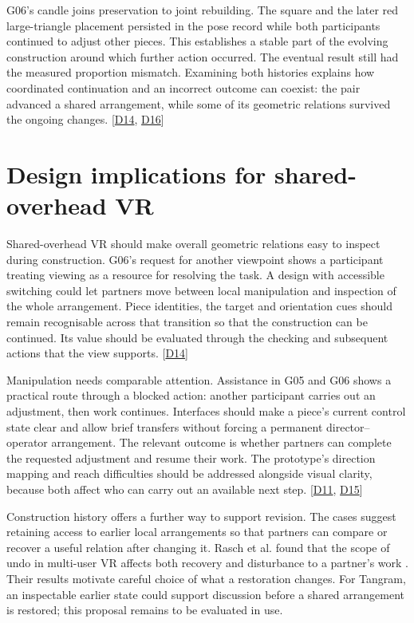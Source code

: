 G06's candle joins preservation to joint rebuilding. The square and the later red large-triangle placement persisted in the pose record while both participants continued to adjust other pieces. This establishes a stable part of the evolving construction around which further action occurred. The eventual result still had the measured proportion mismatch. Examining both histories explains how coordinated continuation and an incorrect outcome can coexist: the pair advanced a shared arrangement, while some of its geometric relations survived the ongoing changes. [\hyperlink{src:D14}{D14}, \hyperlink{src:D16}{D16}]

\section{Design implications for shared-overhead VR}\label{sec:6-4}

Shared-overhead VR should make overall geometric relations easy to inspect during construction. G06's request for another viewpoint shows a participant treating viewing as a resource for resolving the task. A design with accessible switching could let partners move between local manipulation and inspection of the whole arrangement. Piece identities, the target and orientation cues should remain recognisable across that transition so that the construction can be continued. Its value should be evaluated through the checking and subsequent actions that the view supports. [\hyperlink{src:D14}{D14}]

Manipulation needs comparable attention. Assistance in G05 and G06 shows a practical route through a blocked action: another participant carries out an adjustment, then work continues. Interfaces should make a piece's current control state clear and allow brief transfers without forcing a permanent director--operator arrangement. The relevant outcome is whether partners can complete the requested adjustment and resume their work. The prototype's direction mapping and reach difficulties should be addressed alongside visual clarity, because both affect who can carry out an available next step. [\hyperlink{src:D11}{D11}, \hyperlink{src:D15}{D15}]

Construction history offers a further way to support revision. The cases suggest retaining access to earlier local arrangements so that partners can compare or recover a useful relation after changing it. Rasch et al. found that the scope of undo in multi-user VR affects both recovery and disturbance to a partner's work \cite{rasch2024}. Their results motivate careful choice of what a restoration changes. For Tangram, an inspectable earlier state could support discussion before a shared arrangement is restored; this proposal remains to be evaluated in use.

